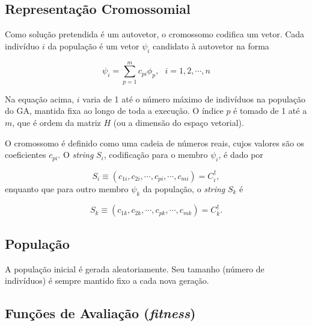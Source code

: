 	\subsection{Representação Cromossomial}
	
	Como solução pretendida é um autovetor, o cromossomo codifica um vetor. Cada indivíduo $i$ da população é um vetor $\psi_i$ candidato à autovetor na forma
	
	\begin{equation}
		\psi_i = \sum_{p=1}^m c_{pi}\phi_p, \mbox{   } i = 1,2, \cdots, n
	\end{equation}
	
	Na equação acima, $i$ varia de 1 até o número máximo de indivíduos na população do GA, mantida fixa ao longo de toda a execução. O índice $p$ é tomado de 1 até a $m$, que é ordem da matriz $H$ (ou a dimensão do espaço vetorial).
	
	O cromossomo é definido como uma cadeia de números reais, cujos valores são os coeficientes $c_{pi}$. O \emph{string} $S_i$, codificação para o membro $\psi_i$, é dado por
	
	\begin{equation}
		S_i \equiv  (c_{1i}, c_{2i}, \cdots, c_{pi}, \cdots, c_{mi}) = C^{\dagger}_i,
	\end{equation}
	enquanto que para outro membro $\psi_k$ da população, o \emph{string} $S_k$ é
	
	\begin{equation}
		S_k \equiv  (c_{1k}, c_{2k}, \cdots, c_{pk}, \cdots, c_{mk}) = C^{\dagger}_k.
	\end{equation}
	
	\subsection{População}

	A população inicial é gerada aleatoriamente. Seu tamanho (número de indivíduos) é sempre mantido fixo a cada nova geração.
	
	\subsection{Funções de Avaliação (\emph{fitness})}

